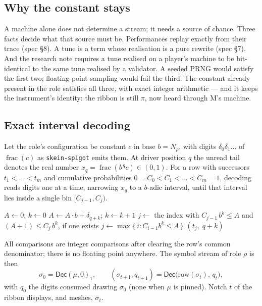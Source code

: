 \documentclass[11pt,a4paper]{article}
\newcommand{\Dec}{\mathsf{Dec}}
\newcommand{\frc}{\operatorname{frac}}
\theoremstyle{definition}
\theoremstyle{plain}
\theoremstyle{remark}
\begin{document}
\subsection{Why the constant stays}

A machine alone does not determine a stream; it needs a source of chance. Three facts decide what
that source must be. Performances replay exactly from their trace (spec \S8). A tune is a term whose
realisation is a pure rewrite (spec \S7). And the research note requires a tune realised on a
player's machine to be bit-identical to the same tune realised by a validator. A seeded PRNG would
satisfy the first two; floating-point sampling would fail the third. The constant already present in
the role satisfies all three, with exact integer arithmetic --- and it keeps the instrument's
identity: the ribbon is still $\pi$, now heard through M's machine.

\subsection{Exact interval decoding}

Let the role's configuration be constant $c$ in base $b=N_\rho$, with digits $\delta_0\delta_1\dots$
of $\frc(c)$ as \texttt{skein-spigot} emits them. At driver position $q$ the unread tail denotes the
real number $x_q=\frc(b^{\,q}c)\in(0,1)$. For a row with successors $t_1<\dots<t_m$ and cumulative
probabilities $0=C_0<C_1<\dots<C_m=1$, decoding reads digits one at a time, narrowing
$x_q$ to a $b$-adic interval, until that interval lies inside a single bin $[C_{j-1},C_j)$.

\begin{algorithm}[H]
\caption{$\Dec(\text{row},q)$ --- one transition, exact}
\label{alg:dec}
\begin{algorithmic}[1]
\State $A\gets 0$;\; $k\gets 0$ \Comment{interval is $[A/b^k,\,(A+1)/b^k)$}
\Repeat
  \State $A\gets A\cdot b+\delta_{q+k}$;\; $k\gets k+1$
  \State $j\gets$ the index with $C_{j-1}\,b^k\le A$ and $(A+1)\le C_j\,b^k$, if one exists
 \State $j\gets\max\{\,i : C_{i-1}b^k\le A\,\}$ 
\EndIf
\State \Return $(t_j,\;q+k)$ 
\end{algorithmic}
\end{algorithm}

All comparisons are integer comparisons after clearing the row's common denominator; there is no
floating point anywhere. The symbol stream of role $\rho$ is then
\[
  \sigma_0=\Dec(\mu,0)_1,\qquad (\sigma_{t+1},q_{t+1})=\Dec\big(\text{row}(\sigma_t),\,q_t\big),
\]
with $q_0$ the digits consumed drawing $\sigma_0$ (none when $\mu$ is pinned). Notch $t$ of the
ribbon displays, and meshes, $\sigma_t$.
\end{document}
